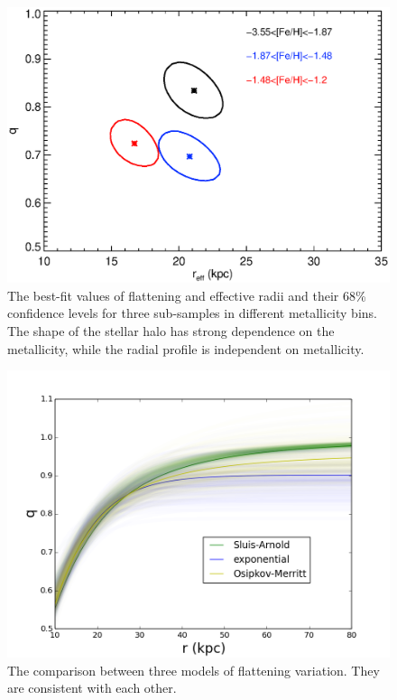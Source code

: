 \documentclass[12pt,preprint]{aastex}
\begin{document}
\begin{figure}[htbp]
\centering
\includegraphics[width=\textwidth]{doublehp_reffqfehbin_Nov12014_einasto_pts96_fixn_contour}
\caption{The best-fit values of flattening and effective radii and their 68\% confidence levels for three sub-samples in different metallicity bins. The shape of the stellar halo has strong dependence on the metallicity, while the radial profile is independent on metallicity.}
\label{f:ffehdependence}
\end{figure}
\begin{figure}[htbp]
\centering
\includegraphics[width=\textwidth]{q_variation}
\caption{The comparison between three models of flattening variation. They are consistent with each other.}
\label{f:fqv}
\end{figure}
\end{document}
